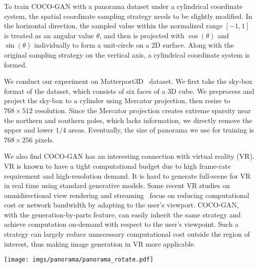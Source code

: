 \documentclass{article}
\newcommand{\modelName}{COCO-GAN }
\newcommand{\modelNamePunc}{COCO-GAN}
\begin{document}
        To train \modelName with a panorama dataset under a cylindrical coordinate system, the spatial coordinate sampling strategy needs to be slightly modified. In the horizontal direction, the sampled value within the normalized range $[-1, 1]$ is treated as an angular value $\theta$, and then is projected with $\cos(\theta)$ and $\sin(\theta)$ individually to form a unit-circle on a 2D surface. Along with the original sampling strategy on the vertical axis, a cylindrical coordinate system is formed. 
        
        We conduct our experiment on Matterport3D~\cite{matterport3d} dataset. We first take the sky-box format of the dataset, which consists of six faces of a 3D cube. We preprocess and project the sky-box to a cylinder using Mercator projection, then resize to $768\times 512$ resolution. Since the Mercator projection creates extreme sparsity near the northern and southern poles, which lacks information, we directly remove the upper and lower $1/4$ areas. Eventually, the size of panorama we use for training is $768\times 256$ pixels.

        We also find \modelName has an interesting connection with virtual reality (VR). VR is known to have a tight computational budget due to high frame-rate requirement and high-resolution demand. It is hard to generate full-scene for VR in real time using standard generative models. Some recent VR studies on omnidirectional view rendering and streaming~\cite{vr-streaming-1,vr-streaming-2,vr-streaming-3} focus on reducing computational cost or network bandwidth by adapting to the user's viewport. \modelNamePunc, with the generation-by-parts feature, can easily inherit the same strategy and achieve computation on-demand with respect to the user's viewpoint. Such a strategy can largely reduce unnecessary computational cost outside the region of interest, thus making image generation in VR more applicable.
        
        \begin{figure*}[t]
            \texttt{[image: imgs/panorama/panorama\_rotate.pdf]}
            \caption{The generated panorama is cyclic in the horizontal direction since \modelName is trained with a cylindrical coordinate system. Here, we paste the same generated panorama twice (from $360^\circ$ to $720^\circ$) to better illustrate the cyclic property of the generated panorama. More generation results are provided in Appendix~\ref{appendix:panorama-samples}.}
            \label{fig:cyclic-panorama}
\end{figure*}
        
\end{document}
